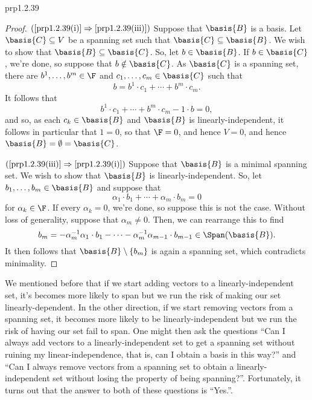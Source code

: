 \begin{prp}{}{prp1.2.39}
\begin{proof}
		\blni
		$(\cref{prp1.2.39(i)}\Rightarrow \cref{prp1.2.39(iii)})$ Suppose that $\basis{B}$ is a basis.  Let $\basis{C}\subseteq V$ be a spanning set such that $\basis{C}\subseteq \basis{B}$.  We wish to show that $\basis{B}\subseteq \basis{C}$.  So, let $b\in \basis{B}$.  If $b\in \basis{C}$, we're done, so suppose that $b\notin \basis{C}$.  As $\basis{C}$ is a spanning set, there are $b^1,\ldots ,b^m\in \F$ and $c_1,\ldots ,c_m\in \basis{C}$ such that
		\begin{equation}
			b=b^1\cdot c_1+\cdots +b^m\cdot c_m.
		\end{equation}
		It follows that
		\begin{equation}
			b^1\cdot c_1+\cdots +b^m\cdot c_m-1\cdot b=0,
		\end{equation}
		and so, as each $c_k\in \basis{B}$ and $\basis{B}$ is linearly-independent, it follows in particular that $1=0$, so that $\F =0$, and hence $V=0$, and hence $\basis{B}=\emptyset =\basis{C}$.
		
		\blni
		$(\cref{prp1.2.39(iii)}\Rightarrow \cref{prp1.2.39(i)})$ Suppose that $\basis{B}$ is a minimal spanning set.  We wish to show that $\basis{B}$ is linearly-independent.  So, let $b_1,\ldots ,b_m\in \basis{B}$ and suppose that
		\begin{equation}
			\alpha _1\cdot b_1+\cdots +\alpha _m\cdot b_m=0
		\end{equation}
		for $\alpha _k\in \F$.  If every $\alpha _k=0$, we're done, so suppose this is not the case.  Without loss of generality, suppose that $\alpha _m\neq 0$.  Then, we can rearrange this to find
		\begin{equation}
			b_m=-\alpha _m^{-1}\alpha _1\cdot b_1-\cdots -\alpha _m^{-1}\alpha _{m-1}\cdot b_{m-1}\in \Span (\basis{B}).
		\end{equation}
		It then follows that $\basis{B}\setminus \{ b_m\}$ is again a spanning set, which contradicts minimality.
	\end{proof}
\end{prp}
We mentioned before that if we start adding vectors to a linearly-independent set, it's becomes more likely to span but we run the risk of making our set linearly-dependent.  In the other direction, if we start removing vectors from a spanning set, it becomes more likely to be linearly-independent but we run the risk of having our set fail to span.  One might then ask the questions ``Can I always add vectors to a linearly-independent set to get a spanning set without ruining my linear-independence, that is, can I obtain a basis in this way?'' and ``Can I always remove vectors from a spanning set to obtain a linearly-independent set without losing the property of being spanning?''.  Fortunately, it turns out that the answer to both of these questions is ``Yes.''.
